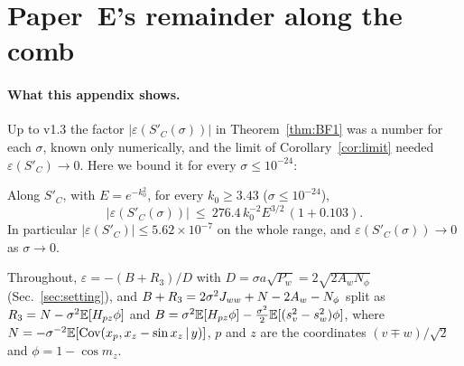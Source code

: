 \section{Paper~E's remainder along the comb}
\label{app:epscomb}

\paragraph*{What this appendix shows.}
Up to v1.3 the factor $|\varepsilon(S'_C(\sigma))|$ in Theorem~\ref{thm:BF1} was a number for each $\sigma$, known only numerically, and the
limit of Corollary~\ref{cor:limit} needed $\varepsilon(S'_C)\to0$. Here we bound it for every $\sigma\le10^{-24}$:

\begin{theorem} 
\label{thm:G1}
Along $S'_C$, with $E=e^{-k_0^2}$, for every $k_0\ge3.43$ ($\sigma\le10^{-24}$),
\begin{equation}
|\varepsilon(S'_C(\sigma))|\ \le\ 276.4\,k_0^{-2}E^{3/2}\,(1+0.103).
\end{equation}
In particular $|\varepsilon(S'_C)|\le5.62\times10^{-7}$ on the whole range, and $\varepsilon(S'_C(\sigma))\to0$ as $\sigma\to0$.
\end{theorem}

Throughout, $\varepsilon=-(B+R_3)/D$ with $D=\sigma a\sqrt{P_w}=2\sqrt{2A_wN_\phi}$ (Sec.~\ref{sec:setting}), and
$B+R_3=2\sigma^2J_{ww}+N-2A_w-N_\phi$ split as $R_3=N-\sigma^2\mathbb{E}[H_{pz}\phi]$ and $B=\sigma^2\mathbb{E}[H_{pz}\phi]-\frac{\sigma^2}2\mathbb{E}[(s_v^2-s_w^2)\phi]$, where
$N=-\sigma^{-2}\mathbb{E}[\mathrm{Cov}(x_p,x_z-\sin x_z\,|\,y)]$, $p$ and $z$ are the coordinates $(v\mp w)/\sqrt2$ and $\phi=1-\cos m_z$.

